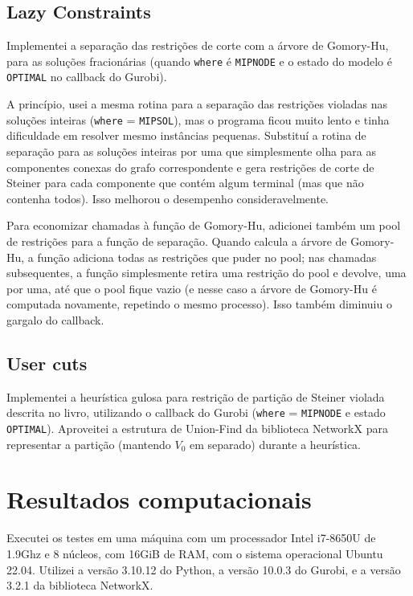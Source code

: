 \documentclass{article}
\begin{document}
\subsection{Lazy Constraints}

Implementei a separação das restrições de corte com a árvore de Gomory-Hu, para
as soluções fracionárias (quando {\tt where} é {\tt MIPNODE} e o estado do
modelo é {\tt OPTIMAL} no callback do Gurobi).

A princípio, usei a mesma rotina para a separação das restrições violadas nas
soluções inteiras ({\tt where} = {\tt MIPSOL}), mas o programa ficou muito
lento e tinha dificuldade em resolver mesmo instâncias pequenas. Substituí a
rotina de separação para as soluções inteiras por uma que simplesmente olha
para as componentes conexas do grafo correspondente e gera restrições de corte
de Steiner para cada componente que contém algum terminal (mas que não contenha
todos). Isso melhorou o desempenho consideravelmente.

Para economizar chamadas à função de Gomory-Hu, adicionei também um pool de
restrições para a função de separação. Quando calcula a árvore de Gomory-Hu, a
função adiciona todas as restrições que puder no pool; nas chamadas
subsequentes, a função simplesmente retira uma restrição do pool e devolve, uma
por uma, até que o pool fique vazio (e nesse caso a árvore de Gomory-Hu é
computada novamente, repetindo o mesmo processo). Isso também diminuiu o
gargalo do callback.

\subsection{User cuts}

Implementei a heurística gulosa para restrição de partição de Steiner violada
descrita no livro, utilizando o callback do Gurobi ({\tt where} = {\tt MIPNODE} e estado {\tt OPTIMAL}). Aproveitei a estrutura de Union-Find da biblioteca NetworkX
para representar a partição (mantendo $V_0$ em separado) durante a heurística.

\section{Resultados computacionais}

Executei os testes em uma máquina com um processador Intel i7-8650U de 1.9Ghz e 8 núcleos, com 16GiB de RAM, com o sistema operacional Ubuntu 22.04.
Utilizei a versão 3.10.12 do Python, a versão 10.0.3 do Gurobi, e a versão 3.2.1 da biblioteca NetworkX.
\end{document}
